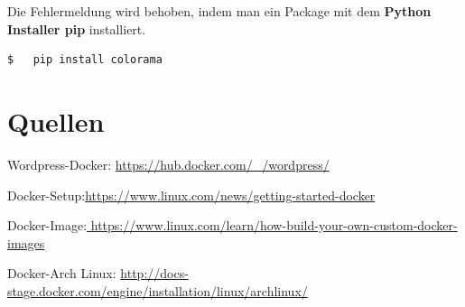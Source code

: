 		Die Fehlermeldung wird behoben, indem man ein Package mit dem \textbf{Python Installer pip} installiert.
		\begin{lstlisting}[language=bash,caption={pip Installationsanweisung}]
		$	pip install colorama
		\end{lstlisting}
		
\section{Quellen}

Wordpress-Docker: \url{ https://hub.docker.com/_/wordpress/}

Docker-Setup:\url{https://www.linux.com/news/getting-started-docker}

Docker-Image:\url{ https://www.linux.com/learn/how-build-your-own-custom-docker-images}

Docker-Arch Linux: \url{http://docs-stage.docker.com/engine/installation/linux/archlinux/}
		
	
		
		
		
	